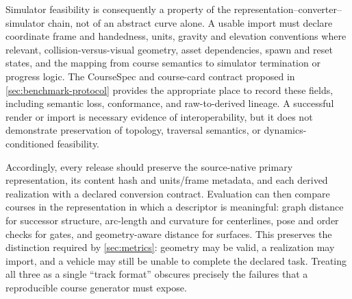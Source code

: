 Simulator feasibility is consequently a property of the representation--converter--
simulator chain, not of an abstract curve alone. A usable import must declare coordinate
frame and handedness, units, gravity and elevation conventions where relevant,
collision-versus-visual geometry, asset dependencies, spawn and reset states, and the
mapping from course semantics to simulator termination or progress logic. The
CourseSpec and course-card contract proposed in \cref{sec:benchmark-protocol} provides
the appropriate place to record these fields, including semantic loss, conformance,
and raw-to-derived lineage. A successful render or import is necessary evidence of
interoperability, but it does not demonstrate preservation of topology, traversal
semantics, or dynamics-conditioned feasibility.

Accordingly, every release should preserve the source-native primary representation,
its content hash and units/frame metadata, and each derived realization with a declared
conversion contract. Evaluation can then compare courses in the representation in
which a descriptor is meaningful: graph distance for successor structure, arc-length
and curvature for centerlines, pose and order checks for gates, and geometry-aware
distance for surfaces. This preserves the distinction required by
\cref{sec:metrics}: geometry may be valid, a realization may import, and a vehicle
may still be unable to complete the declared task. Treating all three as a single
``track format'' obscures precisely the failures that a reproducible course generator
must expose.
